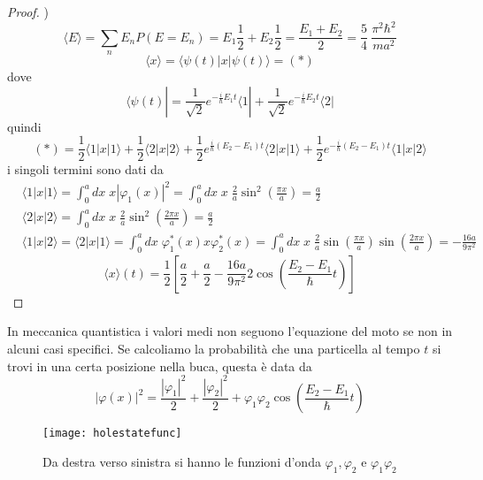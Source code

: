 \begin{proof}
) 
\begin{equation*}
\langle E \rangle = \sum_{n} E_n P(E = E_n) = E_1 \frac{1}{2} + E_2 \frac{1}{2} = \frac{E_1 +E_2}{2} = \frac{5}{4}\ \frac{\pi^2\hbar^2}{ma^2}
\end{equation*}
\vspace{0.1cm}
\begin{equation*}
	\langle x \rangle = \langle \psi(t)|x|\psi(t) \rangle = (*)
\end{equation*}
dove 
\begin{equation*}
 \langle \psi(t)| = \frac{1}{\sqrt{2}} e^{-\frac{i}{\hbar}E_1t}\langle 1 | + \frac{1}{\sqrt{2}}e^{-\frac{i}{\hbar}E_2t}\langle 2|
\end{equation*}
quindi
\begin{equation*}
	(*) = \frac{1}{2} \langle 1 |x|1\rangle +\frac{1}{2}\langle 2| x |2 \rangle  +\frac{1}{2}e^{\frac{i}{\hbar}(E_2-E_1)t}\langle 2 |x|1 \rangle +\frac{1}{2}e^{-\frac{i}{\hbar}(E_2-E_1)t}\langle 1 |x|2 \rangle 
\end{equation*}
i singoli termini sono dati da 
\begin{align*}
	&\langle 1 |x|1 \rangle = \int_{0}^{a}dx \;x |\varphi_1(x)|^2 = \int_{0}^{a}dx \; x \;\frac{2}{a} \sin^2\left ( \frac{\pi x}{a}\right) = \frac{a}{2} \\[0.5cm]
	&\langle 2 | x | 2 \rangle = \int_{0}^{a} dx \; x \; \frac{2}{a} \sin^2 \left( \frac{2\pi x}{a} \right) = \frac{a}{2} \\[0.5cm]
	& \langle 1| x|2 \rangle = \langle 2|x|1\rangle = \int_{0}^{a}dx \;  \varphi_1^*(x)x \varphi_2^*(x) = \int_{0}^{a}dx \; x \; \frac{2}{a} \sin \left( \frac{\pi x}{a}\right) \sin \left( \frac{2 \pi x}{a}\right) = - \frac{16a}{9 \pi^2}
\end{align*}
\newpage
\begin{equation*}
	\langle x \rangle (t) = \frac{1}{2} \left [\frac{a}{2} + \frac{a}{2} - \frac{16a}{9 \pi^2} 2\cos \left (\frac{E_2 -E_1}{\hbar}t\right)\right ]
\end{equation*}
\end{proof}

In meccanica quantistica i valori medi non seguono l'equazione del moto se non in alcuni casi specifici. Se calcoliamo la probabilit\`a che una particella al tempo $t$ si trovi in una certa posizione nella buca, questa \`e data da
\begin{equation}
	|\varphi(x)|^2 = \frac{|\varphi_1|^2}{2} + \frac{|\varphi_2|^2}{2} + \varphi_1\varphi_2 \cos \left( \frac{E_2 -E_1}{\hbar}t \right)
\end{equation}
\begin{figure}[!ht]
\vspace{0.1in}
\texttt{[image: holestatefunc]}	
\centering
\vspace{0.1in}
\caption{Da destra verso sinistra si hanno  le funzioni d'onda $\varphi_1,\varphi_2$ e $\varphi_1\varphi_2$ }
\end{figure}

